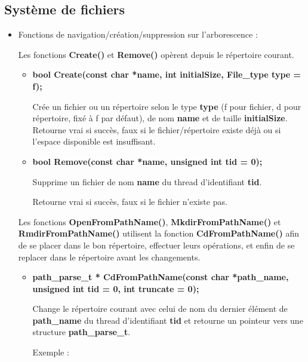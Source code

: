 \documentclass{article}
\begin{document}
\subsection{Système de fichiers}

\begin{itemize}

\item
Fonctions de navigation/création/suppression sur l'arborescence :

Les fonctions \textbf{Create()} et \textbf{Remove()} opèrent depuis le répertoire courant.

\begin{itemize}

  \item
  \textbf{bool Create(const char *name, int initialSize, File\_type type = f);}

  Crée un fichier ou un répertoire selon le type \textbf{type} (f pour fichier, d pour répertoire, fixé à f par défaut), de nom \textbf{name} et de taille \textbf{initialSize}.
  Retourne vrai si succès, faux si le fichier/répertoire existe déjà ou si l'espace disponible est insuffisant.

    \item
    \textbf{ bool Remove(const char *name, unsigned int tid = 0);}

    Supprime un fichier de nom \textbf{name} du thread d'identifiant \textbf{tid}.

    Retourne vrai si succès, faux si le fichier n'existe pas.

\end{itemize}

Les fonctions \textbf{OpenFromPathName()},  \textbf{MkdirFromPathName()} et  \textbf{RmdirFromPathName()} utilisent la fonction  \textbf{CdFromPathName()} afin de se placer dans le bon répertoire, effectuer leurs opérations, et enfin de se replacer dans le répertoire avant les changements.

     \begin{itemize}

     \item
      \textbf{path\_parse\_t * CdFromPathName(const char *path\_name, unsigned int tid = 0, int truncate = 0);}

     Change le répertoire courant avec celui de nom du dernier élément de \textbf{path\_name} du thread d'identifiant \textbf{tid} et retourne un pointeur vers une structure  \textbf{path\_parse\_t}.

     Exemple :


\end{itemize}
\end{itemize}
\end{document}

